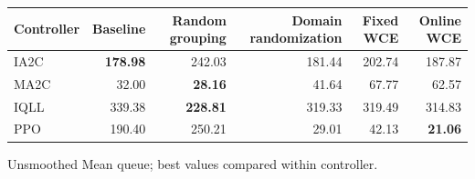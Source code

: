 \begin{tabular}{lrrrrr}
\hline
Controller & Baseline & Random grouping & Domain randomization & Fixed WCE & Online WCE \\
\hline
IA2C & \textbf{178.98} & 242.03 & 181.44 & 202.74 & 187.87 \\
MA2C & 32.00 & \textbf{28.16} & 41.64 & 67.77 & 62.57 \\
IQLL & 339.38 & \textbf{228.81} & 319.33 & 319.49 & 314.83 \\
PPO & 190.40 & 250.21 & 29.01 & 42.13 & \textbf{21.06} \\
\hline
\end{tabular}
Unsmoothed Mean queue; best values compared within controller.
